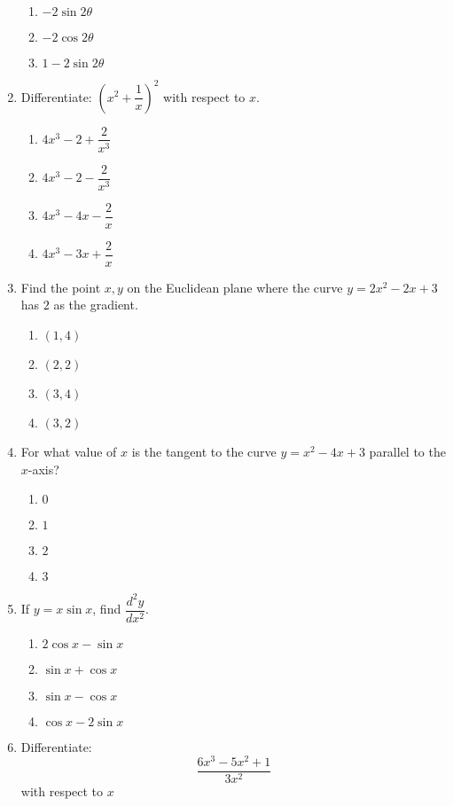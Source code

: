\begin{multicols}{2}
\begin{enumerate}[label={\arabic*.}]
\begin{enumerate}[label={\Alph*.}]
            \item  \(-2\sin 2\theta\)
            \item  \(-2\cos 2\theta\)
            \item  \(1-2\sin 2\theta\)
        \end{enumerate}
  \item Differentiate: \(\left({x}^{2} + \dfrac{1}{x}\right)^2\) with respect to \(x\).
       \begin{enumerate}[label={\Alph*.}]
            \item \(4{x}^{3} - 2 + \dfrac{2}{{x}^{3}}\)
            \item  \(4{x}^{3} - 2 - \dfrac{2}{{x}^{3}}\)
            \item   \(4{x}^{3} - 4x - \dfrac{2}{x}\)
            \item    \(4{x}^{3} - 3x + \dfrac{2}{x}\)
        \end{enumerate}
\item Find the point \(x,y\) on the Euclidean plane where the curve \(y = 2x^{2} - 2x +3\) has \(2\) as the gradient.
    \begin{enumerate}[label={\Alph*.}]
        \item \((1, 4)\)
        \item \((2, 2)\)
        \item \((3, 4)\)
        \item \((3, 2)\)
    \end{enumerate}  
\item For what value of \(x\) is the tangent to the curve \(y = x^{2} - 4x + 3\) parallel to the \(x\)-axis?
    \begin{enumerate}[label={\Alph*.}]
        \item \(0\)
        \item \(1\)
        \item \(2\)
        \item \(3\)
    \end{enumerate}   
\item If \(y = x \sin x\), find \( \dfrac{d^2y}{d{x}^{2}} \).
	\begin{enumerate}[label={\Alph*.}]
	\item \(2\cos x - \sin x\)
	\item \(\sin x + \cos x\)
	\item \(\sin x  - \cos  x\)
	\item \( \cos x  - 2\sin x \)
	\end{enumerate}
\item Differentiate: \[\dfrac{6x^{3} - 5x^{2} + 1}{3x^{2}}\] with respect to \(x\)

\end{enumerate}
\end{multicols}
